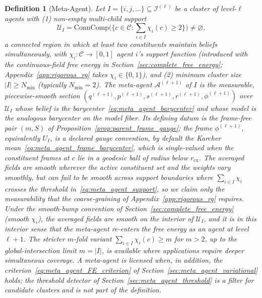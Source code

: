 \documentclass[11pt]{article}
\newtheorem{definition}{Definition}
\begin{document}
\begin{definition}[Meta-Agent]
Let $I = \{i, j, \ldots\} \subseteq \mathcal{I}^{(\ell)}$ be a cluster of level-$\ell$ agents with (1) non-empty multi-child support
\begin{equation}
\mathcal{U}_I = \mathrm{ConnComp}\Big(\big\{c \in \mathcal{C}: \textstyle\sum_{i \in I} \chi_i(c) \ge 2\big\}\Big) \neq \varnothing,
\label{eq:meta_agent_support}
\end{equation}
a connected region in which at least two constituents maintain beliefs simultaneously, with $\chi_i: \mathcal{C} \to [0, 1]$ agent $i$'s support function (introduced with the continuous-field free energy in Section~\ref{sec:complete_free_energy}; Appendix~\ref{app:rigorous_rg} takes $\chi_i \in \{0, 1\}$), and (2) minimum cluster size $|I| \geq N_{\min}$ (typically $N_{\min} = 2$). The meta-agent $\mathcal{A}^{(\ell+1)}$ of $I$ is the measurable, piecewise-smooth section $(q^{(\ell+1)}, p^{(\ell+1)}, s^{(\ell+1)}, r^{(\ell+1)}, \phi^{(\ell+1)})$ over $\mathcal{U}_I$ whose belief is the barycenter~\eqref{eq:meta_agent_barycenter} and whose model is the analogous barycenter on the model fiber. Its defining datum is the frame-free pair $(m, S)$ of Proposition~\ref{prop:parent_frame_gauge}; the frame $\phi^{(\ell+1)}$, equivalently $U_I$, is a declared gauge convention, by default the Karcher mean~\eqref{eq:meta_agent_frame_barycenter}, which is single-valued when the constituent frames at $c$ lie in a geodesic ball of radius below $r_{\mathrm{cx}}$. The averaged fields are smooth wherever the active constituent set and the weights vary smoothly, but can fail to be smooth across support boundaries where $\sum_{i \in I}\chi_i$ crosses the threshold in~\eqref{eq:meta_agent_support}, so we claim only the measurability that the coarse-graining of Appendix~\ref{app:rigorous_rg} requires. Under the smooth-bump convention of Section~\ref{sec:complete_free_energy} (smooth $\chi_i$), the averaged fields are smooth on the interior of $\mathcal{U}_I$, and it is in this interior sense that the meta-agent re-enters the free energy as an agent at level $\ell+1$. The stricter $m$-fold variant $\sum_{i \in I}\chi_i(c) \ge m$ for $m > 2$, up to the global-intersection limit $m = |I|$, is available where applications require deeper simultaneous coverage. A meta-agent is \emph{licensed} when, in addition, the criterion~\eqref{eq:meta_agent_FE_criterion} of Section~\ref{sec:meta_agent_variational} holds; the threshold detector of Section~\ref{sec:meta_agent_threshold} is a filter for candidate clusters and is not part of the definition.
\end{definition}
\end{document}
